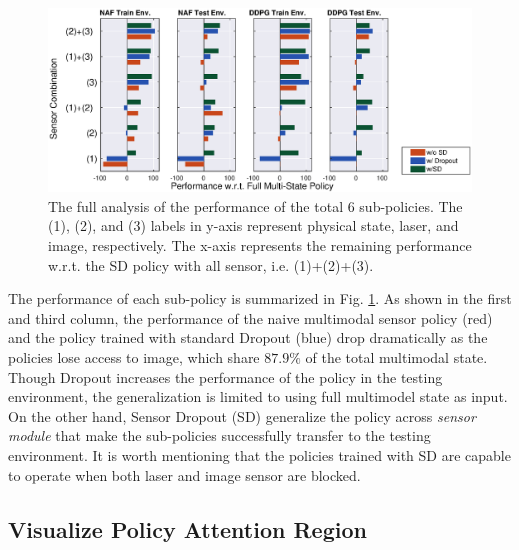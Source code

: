 \documentclass[../thesis.tex]{subfiles}
\begin{document}
\begin{figure}[t]
\vskip -0.1in
\centering
\includegraphics[width=\columnwidth]{./MultimodalDRL/fig/all_policy}
\caption{The full analysis of the performance of the total $6$ sub-policies. The (1), (2), and (3) labels in y-axis represent physical state, laser, and image, respectively. The x-axis represents the remaining performance w.r.t. the SD policy with all sensor, i.e. (1)+(2)+(3).}
\label{fig:full-sd-policy}
\vskip -0.1in
\end{figure} 

The performance of each sub-policy is summarized in Fig. \ref{fig:full-sd-policy}. 
As shown in the first and third column, the performance of the naive multimodal sensor policy (red) and the policy trained with standard Dropout (blue) drop dramatically as the policies lose access to image, which share $87.9\%$ of the total multimodal state. Though Dropout increases the performance of the policy in the testing environment, the generalization is limited to using full multimodel state  as input. On the other hand, Sensor Dropout (SD) generalize the policy across \textit{sensor module} that make the sub-policies successfully transfer to the testing environment. It is worth mentioning that the policies trained with SD are capable to operate when both laser and image sensor are blocked.


\subsection{Visualize Policy Attention Region}
\end{document}
